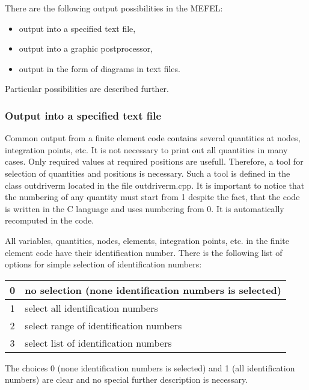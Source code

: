 There are the following output possibilities in the MEFEL:
\begin{itemize}
\item output into a specified text file,
\item output into a graphic postprocessor,
\item output in the form of diagrams in text files.
\end{itemize}
Particular possibilities are described further.


\subsubsection{Output into a specified text file}
Common output from a finite element code contains several quantities at nodes, integration points,
etc. It is not necessary to print out all quantities in many cases. Only required values at
required positions are usefull. Therefore, a tool for selection of quantities and positions
is necessary. Such a tool is defined in the class {\sf outdriverm} located in the file outdriverm.cpp.
It is important to notice that the numbering of any quantity must start from 1 despite the fact, that
the code is written in the C language and uses numbering from 0. It is automatically recomputed in the
code.

All variables, quantities, nodes, elements, integration points, etc. in the finite element code have
their identification number. There is the following list of options for simple selection of
identification numbers:

\begin{table}[h]
\begin{center}
\begin{tabular}{|c|l|}
\hline
 0 & no selection (none identification numbers is selected)
\\ \hline
 1 & select all identification numbers
\\ \hline
 2 & select range of identification numbers
\\ \hline
 3 & select list of identification numbers
\\ \hline
\end{tabular}
\label{tabselect}
\end{center}
\end{table}

The choices 0 (none identification numbers is selected) and 1 (all identification numbers) are clear
and no special further description is necessary.

